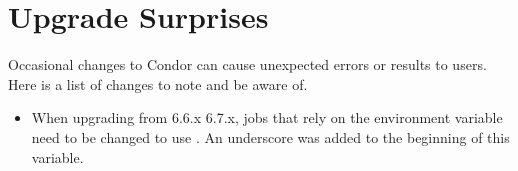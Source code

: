 \section{\label{sec:gotchas}Upgrade Surprises}

Occasional changes to Condor can cause unexpected errors or results
to users.
Here is a list of changes to note and be aware of.

\begin{itemize}

\item When upgrading from 6.6.x 6.7.x,
  jobs that rely on the environment variable 
  need to be changed to use .
  An underscore was added to the beginning of this variable.

\end{itemize}

